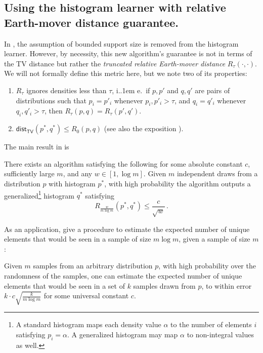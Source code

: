 \documentclass{theoretics}
\newcommand*\ie{i.\kern.1em e.\ }
\newcommand{\dist}{\mathsf{dist}}
\newcommand{\TV}{\mathsf{TV}}
\begin{document}
\subsection{Using the histogram learner with relative Earth-mover distance guarantee.}
In \cite{VV16}, the assumption of bounded support size is removed from the histogram learner.
However, by necessity, this new algorithm's guarantee is not in terms of the TV distance but rather
the \emph{truncated relative Earth-mover distance} $R_\tau(\cdot, \cdot)$. We will not formally
define this metric here, but we note two of its properties:
\begin{enumerate}
\item $R_\tau$ ignores densities less than $\tau$, \ie if $p, p'$ and  $q, q'$ are pairs of distributions
such that $p_i = p'_i$ whenever $p_i, p'_i > \tau$, and $q_i = q'_i$ whenever $q_i, q'_i > \tau$,
then $R_\tau(p,q) = R_\tau(p',q')$.
\item $\dist_\TV(p^*,q^*) \leq R_0(p,q)$ (see also the exposition \cite{GR20}).
\end{enumerate}
The main result in \cite{VV16} is

\begin{theorem}
    \label{res:vv16-main}
    There exists an algorithm satisfying the following for some absolute constant $c$, sufficiently
    large $m$, and any $w \in [1, \log m]$. Given $m$ independent draws from a distribution $p$ with
    histogram $p^*$, with high probability the algorithm outputs a generalized\footnote{A standard
        histogram maps each density value $\alpha$ to the number of elements $i$ satisfying $p_i =
    \alpha$. A generalized histogram may map $\alpha$ to non-integral values as well.} histogram
    $q^*$ satisfying
    \[
        R_{\frac{w}{m \log m}}(p^*, q^*) \le \frac{c}{\sqrt{w}} \,.
    \]
\end{theorem}

As an application, \cite{VV16} give a procedure to estimate the expected number of unique elements
that would be seen in a sample of size $m \log m$, given a sample of size $m$:

\begin{theorem}
    \label{res:vv16-unique}
    Given $m$ samples from an arbitrary distribution $p$, with high probability over the randomness
    of the samples, one can estimate the expected number of unique elements that would be seen in a
    set of $k$ samples drawn from $p$, to within error $k \cdot c \sqrt{\frac{k}{m \log m}}$ for
    some universal constant $c$.
\end{theorem}
\end{document}

